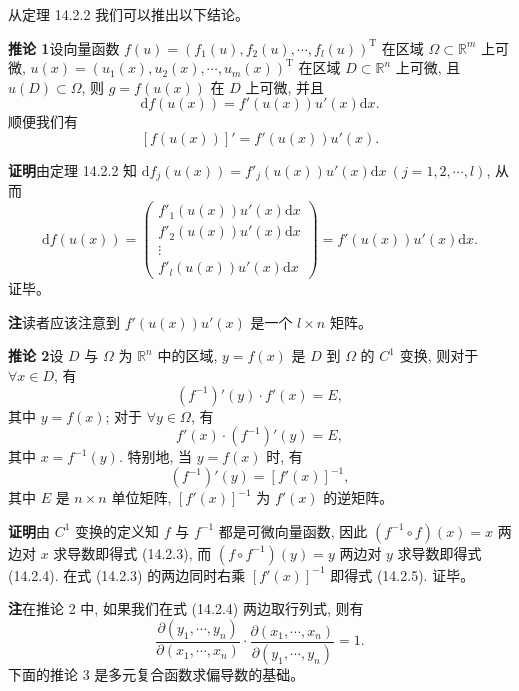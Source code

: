 \documentclass[UTF8,12pt,a4paper,fontset=fandol]{ctexart}
\begin{document}
从定理 14.2.2 我们可以推出以下结论。

\noindent\textbf{推论 1}\quad 设向量函数 $f(u)=(f_1(u),f_2(u),\cdots,f_l(u))^\mathrm T$ 在区域 $\Omega\subset\mathbb R^m$ 上可微, $u(x)=(u_1(x),u_2(x),\cdots,u_m(x))^\mathrm T$ 在区域 $D\subset\mathbb R^n$ 上可微, 且 $u(D)\subset\Omega$, 则 $g=f(u(x))$ 在 $D$ 上可微, 并且
\[
  \mathrm df(u(x))=f'(u(x))u'(x)\mathrm dx.
\]
顺便我们有
\[
  [f(u(x))]'=f'(u(x))u'(x).
\]

\noindent\textbf{证明}\quad 由定理 14.2.2 知 $\mathrm df_j(u(x))=f'_j(u(x))u'(x)\mathrm dx\ (j=1,2,\cdots,l)$, 从而
\[
  \mathrm df(u(x))=
  \begin{pmatrix}
    f'_1(u(x))u'(x)\mathrm dx\\
    f'_2(u(x))u'(x)\mathrm dx\\
    \vdots\\
    f'_l(u(x))u'(x)\mathrm dx
  \end{pmatrix}
  =f'(u(x))u'(x)\mathrm dx.
\]
证毕。

\noindent\textbf{注}\quad 读者应该注意到 $f'(u(x))u'(x)$ 是一个 $l\times n$ 矩阵。

\noindent\textbf{推论 2}\quad 设 $D$ 与 $\Omega$ 为 $\mathbb R^n$ 中的区域, $y=f(x)$ 是 $D$ 到 $\Omega$ 的 $C^1$ 变换, 则对于 $\forall x\in D$, 有
\begin{equation}
  (f^{-1})'(y)\cdot f'(x)=E,
\tag{14.2.3}
\end{equation}
其中 $y=f(x)$; 对于 $\forall y\in\Omega$, 有
\begin{equation}
  f'(x)\cdot(f^{-1})'(y)=E,
\tag{14.2.4}
\end{equation}
其中 $x=f^{-1}(y)$. 特别地, 当 $y=f(x)$ 时, 有
\begin{equation}
  (f^{-1})'(y)=[f'(x)]^{-1},
\tag{14.2.5}
\end{equation}
其中 $E$ 是 $n\times n$ 单位矩阵, $[f'(x)]^{-1}$ 为 $f'(x)$ 的逆矩阵。

\noindent\textbf{证明}\quad 由 $C^1$ 变换的定义知 $f$ 与 $f^{-1}$ 都是可微向量函数, 因此 $(f^{-1}\circ f)(x)=x$ 两边对 $x$ 求导数即得式 (14.2.3), 而 $(f\circ f^{-1})(y)=y$ 两边对 $y$ 求导数即得式 (14.2.4). 在式 (14.2.3) 的两边同时右乘 $[f'(x)]^{-1}$ 即得式 (14.2.5). 证毕。

\noindent\textbf{注}\quad 在推论 2 中, 如果我们在式 (14.2.4) 两边取行列式, 则有
\begin{equation}
  \frac{\partial(y_1,\cdots,y_n)}{\partial(x_1,\cdots,x_n)}
  \cdot
  \frac{\partial(x_1,\cdots,x_n)}{\partial(y_1,\cdots,y_n)}
  =1.
\tag{14.2.6}
\end{equation}
下面的推论 3 是多元复合函数求偏导数的基础。
\end{document}
